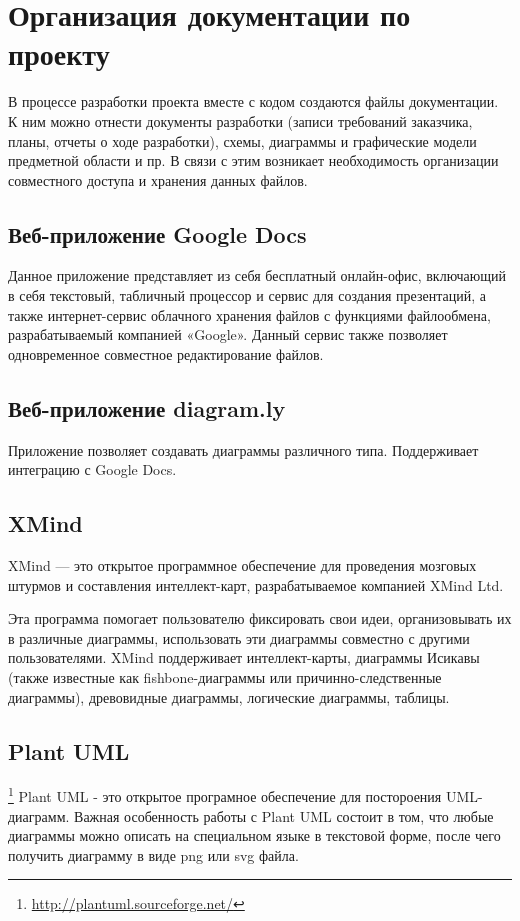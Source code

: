 \section{Организация документации по проекту}
В процессе разработки проекта вместе с кодом создаются файлы документации. К ним
можно отнести документы разработки (записи требований заказчика, планы, отчеты о
ходе разработки), схемы, диаграммы и графические модели предметной области и пр.
В связи с этим возникает необходимость организации совместного доступа и
хранения данных файлов.

\subsection{Веб-приложение  Google Docs}
Данное приложение представляет из себя бесплатный онлайн-офис, включающий в себя
текстовый, табличный процессор и сервис для создания презентаций, а также
интернет-сервис облачного хранения файлов с функциями файлообмена,
разрабатываемый компанией «Google». Данный сервис также позволяет одновременное
совместное редактирование файлов.

\subsection{Веб-приложение diagram.ly}
Приложение позволяет создавать диаграммы различного типа. Поддерживает интеграцию с Google Docs.

\subsection{XMind}
XMind — это открытое программное обеспечение для проведения мозговых штурмов и
составления интеллект-карт, разрабатываемое компанией XMind Ltd.

Эта программа помогает пользователю фиксировать свои идеи, организовывать их в
различные диаграммы, использовать эти диаграммы совместно с другими
пользователями. XMind поддерживает интеллект-карты, диаграммы Исикавы (также
известные как fishbone-диаграммы или причинно-следственные диаграммы),
древовидные диаграммы, логические диаграммы, таблицы.

\subsection{Plant UML}\footnote{
	\url{http://plantuml.sourceforge.net/}
}
Plant UML - это открытое програмное обеспечение для постороения UML-диаграмм.
Важная особенность работы с Plant UML состоит в том, что любые диаграммы можно
описать на специальном языке в текстовой форме, после чего получить диаграмму в
виде png или svg файла.
